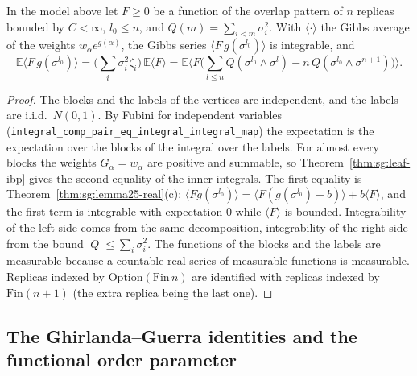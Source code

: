 \begin{theorem}\label{thm:sg:cascade-ibp}
  \leanok
In the model above let $F\ge0$ be a function of the overlap pattern of $n$ replicas bounded by $C<\infty$, $l_0\le n$, and $Q(m)=\sum_{i<m}\sigma_i^2$. With $\langle\cdot\rangle$ the Gibbs average of the weights
$w_\alpha e^{g(\alpha)}$, the Gibbs series $\langle F\,g(\sigma^{l_0})\rangle$ is integrable, and
\[
 \mathbb E\langle F\,g(\sigma^{l_0})\rangle=\Big(\sum_i\sigma_i^2\zeta_i\Big)\,\mathbb E\langle F\rangle
 =\mathbb E\Big\langle F\Big(\sum_{l\le n}Q(\sigma^{l_0}\wedge\sigma^l)-n\,Q(\sigma^{l_0}\wedge\sigma^{n+1})\Big)\Big\rangle .
\]
\end{theorem}
\begin{proof}
  \leanok
The blocks and the labels of the vertices are independent, and the labels are i.i.d.\ $N(0,1)$. By Fubini for independent variables
(\texttt{integral\_comp\_pair\_eq\_integral\_integral\_map}) the expectation is the expectation over the blocks of the integral over the labels. For almost every blocks the weights $G_\alpha=w_\alpha$ are positive and summable, so Theorem~\ref{thm:sg:leaf-ibp}
gives the second equality of the inner integrals. The first equality is Theorem~\ref{thm:sg:lemma25-real}(c): $\langle F g(\sigma^{l_0})\rangle=\langle F(g(\sigma^{l_0})-b)\rangle+b\langle F\rangle$, and the first term is integrable with expectation $0$ while
$\langle F\rangle$ is bounded. Integrability of the left side comes from the same decomposition, integrability of the right side from the bound $|Q|\le\sum_i\sigma_i^2$. The functions of the blocks and the labels are measurable because a countable real series of measurable functions is measurable.
Replicas indexed by $\mathrm{Option}(\mathrm{Fin}\,n)$ are identified with replicas indexed by $\mathrm{Fin}(n+1)$ (the extra replica being the last one).
\end{proof}

\subsection*{The Ghirlanda--Guerra identities and the functional order parameter}

